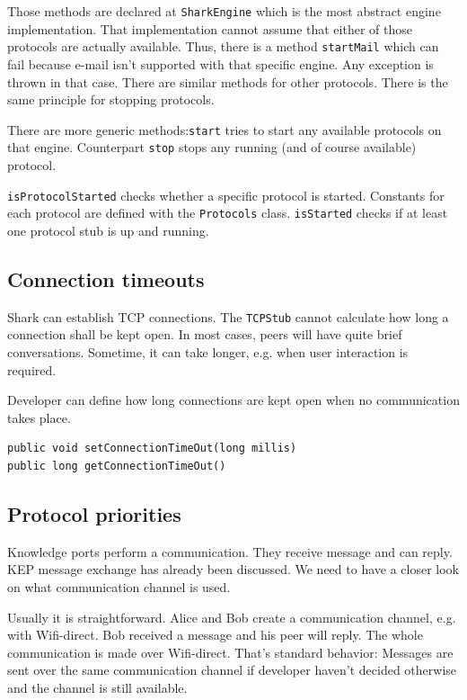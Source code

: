 Those methods are declared at {\tt SharkEngine} which is the most
abstract engine implementation. That implementation cannot assume that
either of those protocols are actually available. Thus, there is a
method {\tt startMail} which can fail because e-mail isn't supported with 
that specific engine. Any exception is thrown in that case. There are
similar methods for other protocols. There is the same principle for stopping protocols. 

There are more generic methods:{\tt start} tries to start any available protocols on that engine. Counterpart {\tt stop} stops any running (and of course available) protocol. 

{\tt isProtocolStarted} checks whether a specific protocol is started. Constants for each protocol are defined with the {\tt Protocols} class. {\tt isStarted} checks if at least one protocol stub is up and running.

\subsection{Connection timeouts}
Shark can establish TCP connections. The {\tt TCPStub} cannot calculate how long a connection shall be kept open. In most cases, peers will have quite brief conversations. Sometime, it can take longer, e.g. when user interaction is required. 

Developer can define how long connections are kept open when no communication takes place. 

\begin{verbatim}
public void setConnectionTimeOut(long millis)
public long getConnectionTimeOut()
\end{verbatim}

\subsection{Protocol priorities}
\label{sec:se:protocolPriorities}
Knowledge ports perform a communication. They receive message and can reply. KEP message exchange has already been discussed. We need to have a closer look on what communication channel is used.

Usually it is straightforward. Alice and Bob create a communication channel, e.g. with Wifi-direct. Bob received a message and his peer will reply. The whole communication is made over Wifi-direct. That's standard behavior: Messages are sent over the same communication channel if developer haven't decided otherwise and the channel is still available.

